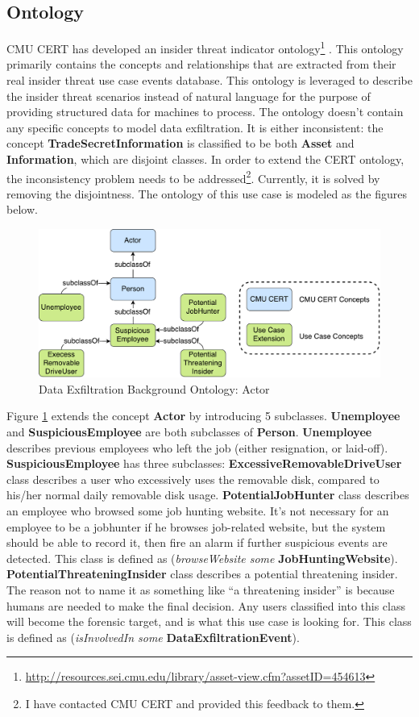 \subsection{Ontology}
CMU CERT has developed an insider threat indicator ontology\footnote{\url{http://resources.sei.cmu.edu/library/asset-view.cfm?assetID=454613}} \cite{costa2014ontology}.
This ontology primarily contains the concepts and relationships that are extracted from their real insider threat use case events database. 
This ontology is leveraged to describe the insider threat scenarios instead of natural language for the purpose of providing structured data for machines to process. 
The ontology doesn't contain any specific concepts to model data exfiltration. 
It is either inconsistent: 
the concept \textbf{TradeSecretInformation} is classified to be both \textbf{Asset} and \textbf{Information}, which are disjoint classes.
In order to extend the CERT ontology, the inconsistency problem needs to be addressed\footnote{I have contacted CMU CERT and provided this feedback to them.}. 
Currently, it is solved by removing the disjointness.
The ontology of this use case is modeled as the figures below. 

\begin{figure}[!htbp]
	\centering
    \includegraphics[width=5in]{img/5-dxoactor.pdf}
    \caption{Data Exfiltration Background Ontology: Actor}
    \label{fig:actor}
\end{figure}

Figure \ref{fig:actor} extends the concept \textbf{Actor} by introducing 5 subclasses. 
\textbf{Unemployee} and \textbf{SuspiciousEmployee} are both subclasses of \textbf{Person}.
\textbf{Unemployee} describes previous employees who left the job (either resignation, or laid-off). 
\textbf{SuspiciousEmployee} has three subclasses:
\textbf{ExcessiveRemovableDriveUser} class describes a user who excessively uses the removable disk, compared to his/her normal daily removable disk usage. 
\textbf{PotentialJobHunter} class describes an employee who browsed some job hunting website. 
It's not necessary for an employee to be a jobhunter if he browses job-related website, but the system should be able to record it, then fire an alarm if further suspicious events are detected. 
This class is defined as (\textit{browseWebsite some} \textbf{JobHuntingWebsite}). 
\textbf{PotentialThreateningInsider} class describes a potential threatening insider.
The reason not to name it as something like ``a threatening insider'' is because humans are needed to make the final decision. 
Any users classified into this class will become the forensic target, and is what this use case is looking for. 
This class is defined as (\textit{isInvolvedIn some} \textbf{DataExfiltrationEvent}). 


